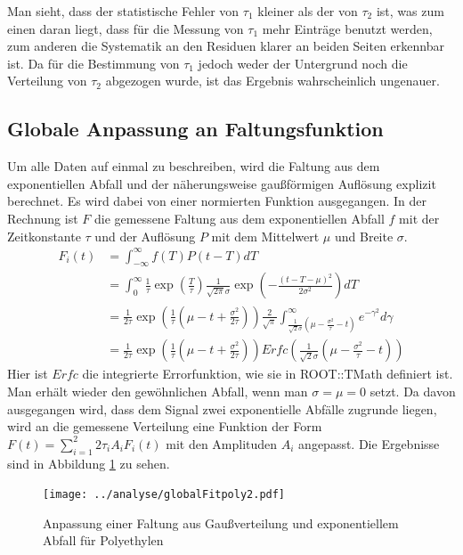 \documentclass[a4paper,12pt]{article}
\begin{document}
Man sieht, dass der statistische Fehler von $τ_1$ kleiner als der von $τ_2$ ist, was zum einen daran
liegt, dass für die Messung von $τ_1$ mehr Einträge benutzt werden, zum anderen die Systematik an
den Residuen klarer an beiden Seiten erkennbar ist. Da für die Bestimmung von $τ_1$ jedoch weder der
Untergrund noch die Verteilung von $τ_2$ abgezogen wurde, ist das Ergebnis wahrscheinlich ungenauer.

\FloatBarrier
\subsection{Globale Anpassung an Faltungsfunktion}
Um alle Daten auf einmal zu beschreiben, wird die Faltung aus dem exponentiellen Abfall und der
näherungsweise gaußförmigen Auflösung explizit berechnet.
Es wird dabei von einer normierten Funktion ausgegangen.
In der Rechnung ist $F$ die gemessene Faltung aus dem exponentiellen Abfall $f$ mit der
Zeitkonstante $τ$ und der Auflösung $P$ mit dem Mittelwert $μ$ und Breite $σ$.
\begin{align*}
	F_i(t) &= \int_{-\infty}^\infty f(T)P(t-T)dT\\
	&= \int_0^\infty \frac{1}{τ}\exp\left( \frac{T}{τ} \right)\frac{1}{\sqrt{2π}σ}\exp\left( -\frac{(t-T-μ)^2}{2σ^2} \right)dT\\
	&= \frac{1}{2τ} \exp\left( \frac{1}{τ}\left( μ-t+\frac{σ^2}{2τ} \right) \right) \frac{2}{\sqrt{π}}\int_{\frac{1}{\sqrt{2}σ}\left( μ-\frac{σ^2}{τ} -t \right)}^\infty  e^{-γ^2}dγ\\
	&= \frac{1}{2τ} \exp\left( \frac{1}{τ}\left( μ-t+\frac{σ^2}{2τ} \right) \right) Erfc\left(\frac{1}{\sqrt{2}σ}\left( μ-\frac{σ^2}{τ} -t \right)\right)
\end{align*}
Hier ist $Erfc$ die integrierte Errorfunktion, wie sie in ROOT::TMath definiert ist. Man erhält
wieder den gewöhnlichen Abfall, wenn man $σ=μ=0$ setzt.
Da davon ausgegangen wird, dass dem Signal zwei exponentielle Abfälle zugrunde liegen, wird an die
gemessene Verteilung eine Funktion der Form $F(t) = \sum_{i=1}^2 2τ_iA_i F_i(t)$ mit den Amplituden
$A_i$ angepasst. Die Ergebnisse sind in Abbildung \ref{fig:globalFit} zu sehen.

\begin{figure}[htb]
	\centering
	\texttt{[image: ../analyse/globalFitpoly2.pdf]}
	\caption{Anpassung einer Faltung aus Gaußverteilung und exponentiellem Abfall für Polyethylen}
	\label{fig:globalFit}
\end{figure}
\end{document}
